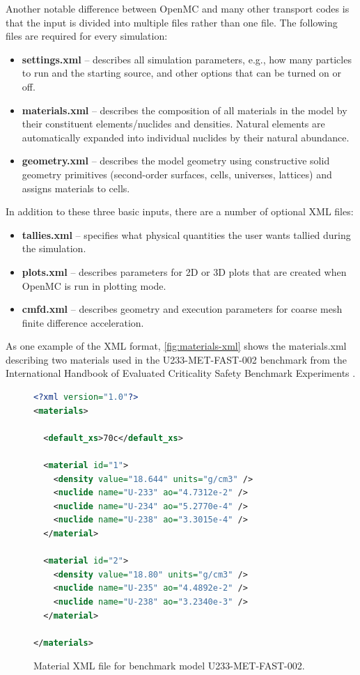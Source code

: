 \documentclass{snamc2013}
\begin{document}
Another notable difference between OpenMC and many other transport codes is that
the input is divided into multiple files rather than one file. The following
files are required for every simulation:
\begin{itemize}
\item \textbf{settings.xml} -- describes all simulation parameters, e.g., how
  many particles to run and the starting source, and other options that can be
  turned on or off.
\item \textbf{materials.xml} -- describes the composition of all materials in
  the model by their constituent elements/nuclides and densities. Natural
  elements are automatically expanded into individual nuclides by their natural
  abundance.
\item \textbf{geometry.xml} -- describes the model geometry using constructive
  solid geometry primitives (second-order surfaces, cells, universes,
  lattices) and assigns materials to cells.
\end{itemize}
In addition to these three basic inputs, there are a number of optional XML
files:
\begin{itemize}
\item \textbf{tallies.xml} -- specifies what physical quantities the user wants
  tallied during the simulation.
\item \textbf{plots.xml} -- describes parameters for 2D or 3D plots that are
  created when OpenMC is run in plotting mode.
\item \textbf{cmfd.xml} -- describes geometry and execution parameters for
  coarse mesh finite difference acceleration.
\end{itemize}
As one example of the XML format, \autoref{fig:materials-xml} shows the
materials.xml describing two materials used in the U233-MET-FAST-002 benchmark
from the International Handbook of Evaluated Criticality Safety Benchmark
Experiments \cite{icsbep-2012}.
\begin{figure}[htb]
  \begin{lstlisting}[language=xml]
<?xml version="1.0"?>
<materials>

  <default_xs>70c</default_xs>

  <material id="1">
    <density value="18.644" units="g/cm3" />
    <nuclide name="U-233" ao="4.7312e-2" />
    <nuclide name="U-234" ao="5.2770e-4" />
    <nuclide name="U-238" ao="3.3015e-4" />
  </material>

  <material id="2">
    <density value="18.80" units="g/cm3" />
    <nuclide name="U-235" ao="4.4892e-2" />
    <nuclide name="U-238" ao="3.2340e-3" />
  </material>

</materials>
  \end{lstlisting}
  \caption{Material XML file for benchmark model U233-MET-FAST-002.}
  \label{fig:materials-xml}
\end{figure}
\end{document}
